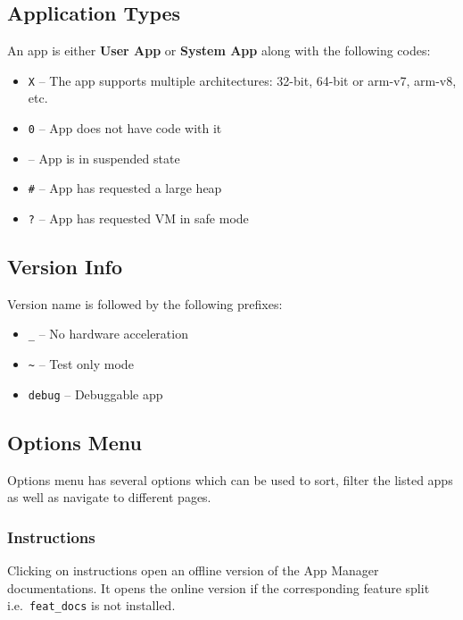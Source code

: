 \subsection{Application Types}\label{subsec:main-page-application-types} %
An app is either \textbf{User App} or \textbf{System App} along with the following codes:
\begin{itemize}
    \item \texttt{X} -- The app supports multiple architectures: 32-bit, 64-bit or arm-v7, arm-v8, etc.
    \item \texttt{0} -- App does not have code with it
    \item \texttt{\textdegree} -- App is in suspended state
    \item \texttt{\#} -- App has requested a large heap
    \item \texttt{?} -- App has requested VM in safe mode
\end{itemize}

\subsection{Version Info}\label{subsec:main-page-version-info} %
Version name is followed by the following prefixes:
\begin{itemize}
    \item \texttt{\_} -- No hardware acceleration
    \item \texttt{\textasciitilde} -- Test only mode
    \item \texttt{debug} -- Debuggable app
\end{itemize}

\subsection{Options Menu}\label{subsec:main-page-options-menu} %
Options menu has several options which can be used to sort, filter the listed apps as well as navigate to different pages.

\subsubsection{Instructions} %
Clicking on instructions open an offline version of the App Manager documentations. It opens the online version if the
corresponding feature split i.e.\ \texttt{feat\_docs} is not installed.

